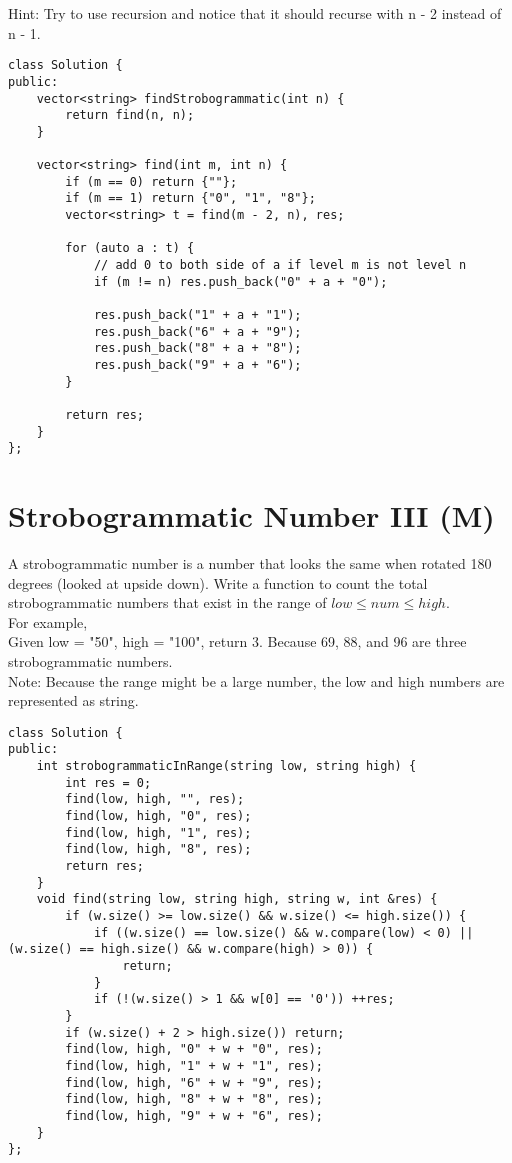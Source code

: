Hint: Try to use recursion and notice that it should recurse with n - 2 instead of n - 1. \\

\begin{lstlisting}
class Solution {
public:
    vector<string> findStrobogrammatic(int n) {
        return find(n, n);
    }
    
    vector<string> find(int m, int n) {
        if (m == 0) return {""};
        if (m == 1) return {"0", "1", "8"};
        vector<string> t = find(m - 2, n), res;
        
        for (auto a : t) {
            // add 0 to both side of a if level m is not level n
            if (m != n) res.push_back("0" + a + "0"); 
            
            res.push_back("1" + a + "1");
            res.push_back("6" + a + "9");
            res.push_back("8" + a + "8");
            res.push_back("9" + a + "6");
        }
        
        return res;
    }
};
\end{lstlisting}


\section{Strobogrammatic Number III (M)}
A strobogrammatic number is a number that looks the same when rotated 180 degrees (looked at upside down). Write a function to count the total strobogrammatic numbers that exist in the range of $low \leq num \leq high$. \\

For example,\\
Given low = "50", high = "100", return 3. Because 69, 88, and 96 are three strobogrammatic numbers. \\

Note: Because the range might be a large number, the low and high numbers are represented as string.\\

\begin{lstlisting}
class Solution {
public:
    int strobogrammaticInRange(string low, string high) {
        int res = 0;
        find(low, high, "", res);
        find(low, high, "0", res);
        find(low, high, "1", res);
        find(low, high, "8", res);
        return res;
    }
    void find(string low, string high, string w, int &res) {
        if (w.size() >= low.size() && w.size() <= high.size()) {
            if ((w.size() == low.size() && w.compare(low) < 0) || (w.size() == high.size() && w.compare(high) > 0)) {
                return;
            }
            if (!(w.size() > 1 && w[0] == '0')) ++res;
        }
        if (w.size() + 2 > high.size()) return;
        find(low, high, "0" + w + "0", res);
        find(low, high, "1" + w + "1", res);
        find(low, high, "6" + w + "9", res);
        find(low, high, "8" + w + "8", res);
        find(low, high, "9" + w + "6", res);
    }
};
\end{lstlisting}


